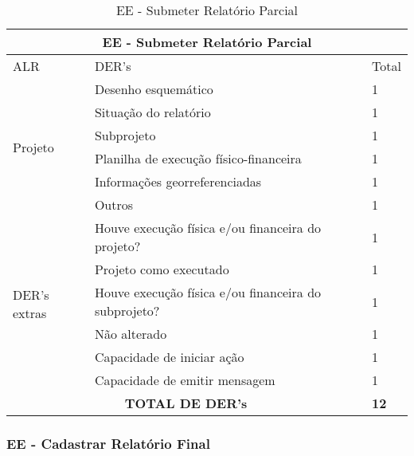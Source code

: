 \begin{table}[!h]
\centering
\caption{EE - Submeter Relatório Parcial}
\label{ee_submeter_relatorio_parcial}
\begin{tabular}{|l|l|l|}
\hline
\multicolumn{3}{|c|}{EE - Submeter Relatório Parcial}                                                                 \\ \hline
ALR                           & DER's                                                & Total              \\ \hline
\multirow{6}{*}{Projeto}    & Desenho esquemático  & 1                  \\ \cline{2-3} 
                             & Situação do relatório & 1 \\ \cline{2-3}
			      & Subprojeto & 1 \\ \cline{2-3}
                              & Planilha de execução físico-financeira               & 1                  \\ \cline{2-3} 
                              & Informações georreferenciadas                        & 1                  \\ \cline{2-3} 
                              & Outros  & 1                  \\ \hline
\multirow{6}{*}{DER's extras} & Houve execução física e/ou financeira do projeto? & 1                  \\ \cline{2-3} 
                              & Projeto como executado & 1 \\ \cline{2-3}
                              & Houve execução física e/ou financeira do subprojeto?    & 1                  \\ \cline{2-3} 
			      & Não alterado                                         & 1                  \\ \cline{2-3} 
                              & Capacidade de iniciar ação                           & 1\\ \cline{2-3}
                              & Capacidade de emitir mensagem                        &1                    \\ \hline
\multicolumn{2}{|c|}{\textbf{TOTAL DE DER's}}                                                 & \textbf{12}                 \\ \hline
\end{tabular}
\end{table}

  \subsubsection{EE - Cadastrar Relatório Final}
  
